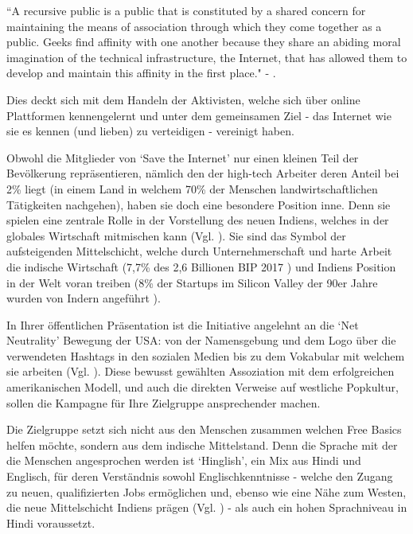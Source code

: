 \documentclass{article}
\begin{document}
``A recursive public is a public that is constituted by a shared concern for maintaining the means of association through which they come together as a public.
Geeks find affinity with one another because they share an abiding moral imagination of the technical infrastructure, the Internet, that has allowed them to develop and maintain this affinity in the first place." - \cite[28]{twoBits}.

\medskip

Dies deckt sich mit dem Handeln der Aktivisten, welche sich über online Plattformen kennengelernt und unter dem gemeinsamen Ziel - das Internet wie sie es kennen (und lieben) zu verteidigen - vereinigt haben.

\medskip

Obwohl die Mitglieder von `Save the Internet' nur einen kleinen Teil der Bevölkerung repräsentieren, nämlich den der high-tech Arbeiter deren Anteil bei 2\% liegt (in einem Land in welchem 70\% der Menschen landwirtschaftlichen Tätigkeiten nachgehen), haben sie doch eine besondere Position inne. Denn sie spielen eine zentrale Rolle in der Vorstellung des neuen Indiens, welches in der globales Wirtschaft mitmischen kann (Vgl. \cite{thomas2012}).
Sie sind das Symbol der aufsteigenden Mittelschicht, welche durch Unternehmerschaft und harte Arbeit die indische Wirtschaft (7,7\% des 2,6 Billionen BIP 2017 \autocite{statistaIndiaGDP}\autocite{imfIndiaGDP}) und Indiens Position in der Welt voran treiben (8\% der Startups im Silicon Valley der 90er Jahre wurden von Indern angeführt \parencite{upadhya2004}).

\medskip

In Ihrer öffentlichen Präsentation ist die Initiative angelehnt an die `Net Neutrality' Bewegung der USA: von der Namensgebung und dem Logo über die verwendeten Hashtags in den sozialen Medien bis zu dem Vokabular mit welchem sie arbeiten (Vgl. \cite{prasad2017}).
Diese bewusst gewählten Assoziation mit dem erfolgreichen amerikanischen Modell, und auch die direkten Verweise auf westliche Popkultur, sollen die Kampagne für Ihre Zielgruppe ansprechender machen.

Die Zielgruppe setzt sich nicht aus den Menschen zusammen welchen Free Basics helfen möchte, sondern aus dem indische Mittelstand. Denn die Sprache mit der die Menschen angesprochen werden ist `Hinglish', ein Mix aus Hindi und Englisch, für deren Verständnis sowohl Englischkenntnisse - welche den Zugang zu neuen, qualifizierten Jobs ermöglichen und, ebenso wie eine Nähe zum Westen, die neue Mittelschicht Indiens prägen (Vgl. \cite{fernandes2006}) - als auch ein hohen Sprachniveau in Hindi voraussetzt.
\end{document}
